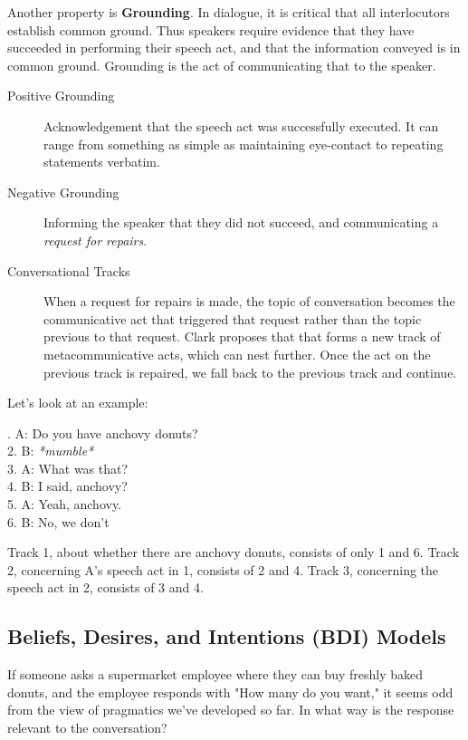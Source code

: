 \documentclass[11pt]{article}
\begin{document}
Another property is \textbf{Grounding}. In dialogue, it is critical that all interlocutors establish common
ground. Thus speakers require evidence that they have succeeded in performing their speech act, and that
the information conveyed is in common ground. Grounding is the act of communicating that to the speaker.

\begin{description}
    \item[Positive Grounding] Acknowledgement that the speech act was successfully executed. It can range
        from something as simple as maintaining eye-contact to repeating statements verbatim.
    \item[Negative Grounding] Informing the speaker that they did not succeed, and communicating a 
        \textit{request for repairs}. 
    \item[Conversational Tracks] When a request for repairs is made, the topic of conversation becomes 
        the communicative act that triggered that request rather than the topic previous to that request.
        Clark proposes that that forms a new track of metacommunicative acts, which can nest further. 
        Once the act on the previous track is repaired, we fall back to the previous track and continue.
\end{description}
Let's look at an example:
\begin{exe}
    . A: Do you have anchovy donuts? \\
        2. B: \textit{*mumble*} \\
        3. A: What was that? \\
        4. B: I said, anchovy? \\
        5. A: Yeah, anchovy. \\
        6. B: No, we don't 
\end{exe}

Track 1, about whether there are anchovy donuts, consists of only 1 and 6. Track 2, concerning A's speech act
in 1, consists of 2 and 4. Track 3, concerning the speech act in 2, consists of 3 and 4.

\subsection{Beliefs, Desires, and Intentions (BDI) Models}
If someone asks a supermarket employee where they can buy freshly baked donuts, and the employee responds with
"How many do you want," it seems odd from the view of pragmatics we've developed so far. In what way is the 
response relevant to the conversation? 
\end{document}
